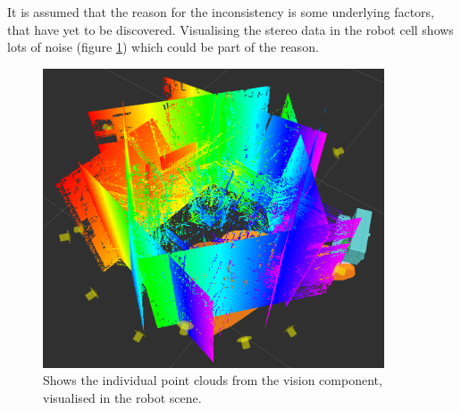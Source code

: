 It is assumed that the reason for the inconsistency is some underlying factors, that have yet to be discovered. Visualising the stereo data in the robot cell shows lots of noise (figure \ref{fig:stereo_vis}) which could be part of the reason. 

\begin{figure}[htb]
	\centering
        \begin{center}
			\includegraphics[width=0.9\textwidth]{graphics/08_resultsdiscussion/stereo_data_in_robotscene.png}
		\end{center}
		\caption{Shows the individual point clouds from the vision component, visualised in the robot scene.}\label{fig:stereo_vis}
\end{figure}